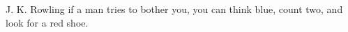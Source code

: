 J. K. Rowling if a man tries to bother you, you can think blue, count two, and look for a red
shoe.

